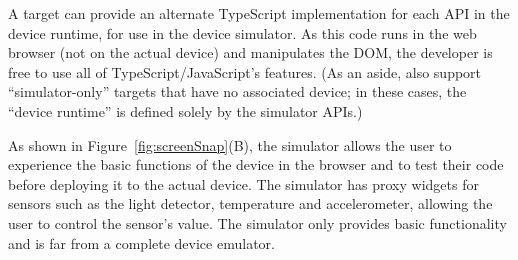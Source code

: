 A \MC target can provide an alternate TypeScript implementation for each API in the device runtime, for use in the device
simulator. As this code runs in the web browser (not on the actual device) and manipulates the DOM, the developer is free to
use all of TypeScript/JavaScript's features. (As an aside, \MC also support ``simulator-only'' targets that have no
associated device; in these cases, the ``device runtime'' is defined solely by the simulator APIs.)

As shown in Figure~\ref{fig:screenSnap}(B), the simulator allows the user to experience the basic functions of the device
in the browser and to test their code
before deploying it to the actual device. The simulator has proxy widgets for sensors such as the 
light detector, temperature and accelerometer, allowing the user to control the sensor's value.  
The simulator only provides basic functionality
and is far from a complete device emulator. 


